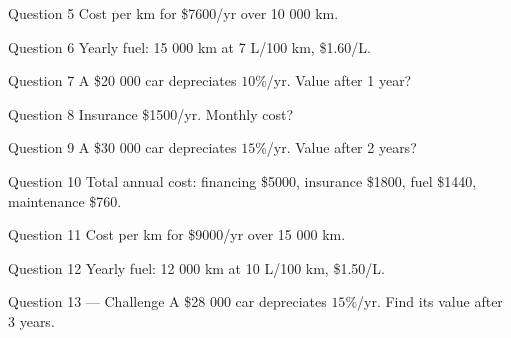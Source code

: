 \documentclass[11pt]{article}
\begin{document}
\begin{qbox}{Question 5}
Cost per km for \$7600/yr over 10 000 km.\workspace{2.4cm}
\end{qbox}

\begin{qbox}{Question 6}
Yearly fuel: 15 000 km at 7 L/100 km, \$1.60/L.\workspace{2.4cm}
\end{qbox}

\begin{qbox}{Question 7}
A \$20 000 car depreciates $10\%$/yr. Value after 1 year?\workspace{2.4cm}
\end{qbox}

\begin{qbox}{Question 8}
Insurance \$1500/yr. Monthly cost?\workspace{2.4cm}
\end{qbox}

\begin{qbox}{Question 9}
A \$30 000 car depreciates $15\%$/yr. Value after 2 years?\workspace{2.4cm}
\end{qbox}

\begin{qbox}{Question 10}
Total annual cost: financing \$5000, insurance \$1800, fuel \$1440, maintenance \$760.\workspace{2.4cm}
\end{qbox}

\begin{qbox}{Question 11}
Cost per km for \$9000/yr over 15 000 km.\workspace{2.4cm}
\end{qbox}

\begin{qbox}{Question 12}
Yearly fuel: 12 000 km at 10 L/100 km, \$1.50/L.\workspace{2.4cm}
\end{qbox}

\begin{qbox}{Question 13 --- Challenge}
A \$28 000 car depreciates $15\%$/yr. Find its value after 3 years.\workspace{3cm}
\end{qbox}

\clearpage
{}
\end{document}
